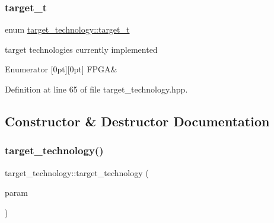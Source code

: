\subsubsection{\texorpdfstring{target\+\_\+t}{target\_t}}
{\footnotesize\ttfamily enum \hyperlink{classtarget__technology_a84257c2d384aa7dce6a060105113459b}{target\+\_\+technology\+::target\+\_\+t}}



target technologies currently implemented 

\begin{DoxyEnumFields}{Enumerator}
[0pt][0pt]{}\mbox{\label{classtarget__technology_a84257c2d384aa7dce6a060105113459bac267ed94b245c882d8f0effb244f60fb}} 
F\+P\+GA&\\
\hline

\end{DoxyEnumFields}


Definition at line 65 of file target\+\_\+technology.\+hpp.



\subsection{Constructor \& Destructor Documentation}
\mbox{\label{classtarget__technology_a5e939d5581b952ea83d34d496d1d2965}} 
\subsubsection{\texorpdfstring{target\+\_\+technology()}{target\_technology()}}
{\footnotesize\ttfamily target\+\_\+technology\+::target\+\_\+technology (\begin{DoxyParamCaption}\item[{const \hyperlink{Parameter_8hpp_a37841774a6fcb479b597fdf8955eb4ea}{Parameter\+Const\+Ref} \&}]{param }\end{DoxyParamCaption})\hspace{0.3cm}{\ttfamily [explicit]}}



